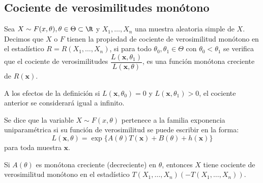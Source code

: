 \subsection{Cociente de verosimilitudes monótono}
\begin{tcolorbox}[colback=blue!5!white, colframe=blue!75!black, title=\textbf{Resultado}]
Sea $X\sim F(x,\theta),\theta\in \Theta\subset\R$ y $X_1,\dots,X_n$ una muestra aleatoria simple de $X$. Decimos que  $X$ o  $F$ tienen la propiedad de cociente de verosimilitud monótono en el estadístico  $R=R(X_1,\dots,X_n)$, si para todo $\theta_0,\theta_1\in \Theta$ con $\theta_0<\theta_1$ se verifica que el cociente de verosimilitudes $\dfrac{L(\mathbf{x},\theta_1)}{L(\mathbf{x},\theta)}$, es una función monótona creciente de $R(\mathbf{x})$.
\end{tcolorbox}
\begin{tcolorbox}[colback=red!5!white, colframe=red!75!black, title=\textbf{Nota}]
A los efectos de la definición si $L(\mathbf{x},\theta_0)=0$ y $L(\mathbf{x},\theta_1)>0$, el cociente anterior se considerará igual a infinito.
\end{tcolorbox}
\begin{tcolorbox}[colback=blue!5!white, colframe=blue!75!black, title=\textbf{Familia exponencia uniparamétrica}]
Se dice que la variable $X\sim F(x,\theta)$ pertenece a la familia exponencia uniparamétrica si su función de verosimilitud se puede escribir en la forma: \[
L(\mathbf{x},\theta)=\exp \{A(\theta)T(\mathbf{x})+B(\theta)+h(\mathbf{x})\}
\] para toda muestra $\mathbf{x}$.

Si $A(\theta)$ es monótona creciente (decreciente) en $\theta$, entonces  $X$ tiene cociente de verosimilitud monótono en el estadístico $T(X_1,\dots,X_n)(-T(X_1,\dots,X_n))$.
\end{tcolorbox}

